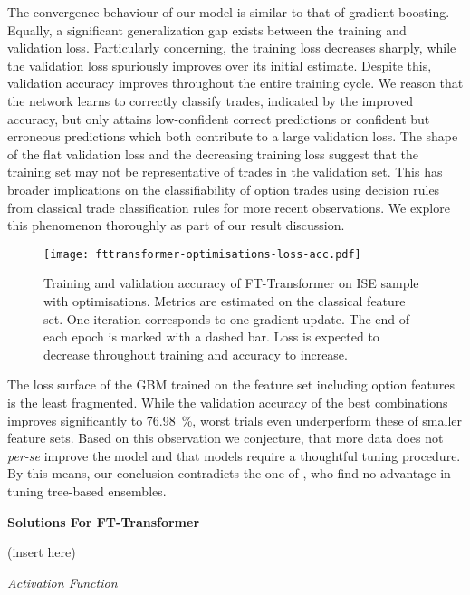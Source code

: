 The convergence behaviour of our model is similar to that of gradient boosting. Equally, a significant generalization gap exists between the training and validation loss. Particularly concerning, the training loss decreases sharply, while the validation loss spuriously improves over its initial estimate. Despite this, validation accuracy improves throughout the entire training cycle. We reason that the network learns to correctly classify trades, indicated by the improved accuracy, but only attains low-confident correct predictions or confident but erroneous predictions which both contribute to a large validation loss. The shape of the flat validation loss and the decreasing training loss suggest that the training set may not be representative of trades in the validation set. This has broader implications on the classifiability of option trades using decision rules from classical trade classification rules for more recent observations. We explore this phenomenon thoroughly as part of our result discussion.


\begin{figure}[!ht]
    \centering
    \texttt{[image: fttransformer-optimisations-loss-acc.pdf]}
    \caption[Training and Validation Accuracy of FT-Transformer on \gls{ISE} with Optimisations]{Training and validation accuracy of FT-Transformer on \gls{ISE} sample with optimisations. Metrics are estimated on the classical feature set. One iteration corresponds to one gradient update. The end of each epoch is marked with a dashed bar. Loss is expected to decrease throughout training and accuracy to increase.}
    \label{fig:fttransformer-optimisations-loss-acc}
\end{figure}
The loss surface of the \gls{GBM} trained on the feature set including option features is the least fragmented. While the validation accuracy of the best combinations improves significantly to \SI{76.98}{\percent}, worst trials even underperform these of smaller feature sets. Based on this observation we conjecture, that more data does not \emph{per-se} improve the model and that models require a thoughtful tuning procedure. By this means, our conclusion contradicts the one of \textcite[][14]{ronenMachineLearningTrade2022}, who find no advantage in tuning tree-based ensembles.

\textbf{Solutions For FT-Transformer}

(insert here)

\emph{Activation Function}

